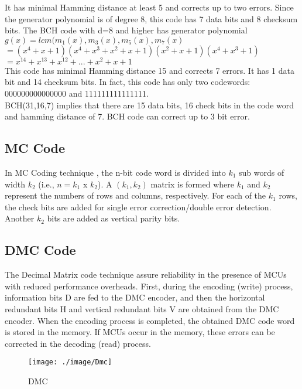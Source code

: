 \documentclass[12pt,a4paper]{report}
\begin{document}
It has minimal Hamming distance at least 5 and corrects up to two errors. Since the generator polynomial is of degree 8, this code has 7 data bits and 8 checksum bits.
The BCH code with d=8 and higher has generator polynomial\\
$g(x) = lcm(m_1(x),m_3(x),m_5(x),m_7(x)$\\
$	= (x^4 + x + 1)(x^4 + x^3 + x^2 + x + 1)(x^2 + x + 1)(x^4 + x^3 + 1)$\\
$	= x^{14} + x^{13} + x^{12} + ... +x^2 + x +1$\\ 
This code has minimal Hamming distance 15 and corrects 7 errors. It has 1 data bit and 14 checksum bits. In fact, this code has only two codewords: 000000000000000 and 111111111111111.\\

BCH(31,16,7)  implies that there are 15 data bits, 16 check bits in the code word and hamming distance of 7. BCH code can correct up to 3 bit error.

\subsection{MC Code}
In MC Coding technique \cite{ArgyridesPradhanKocak}, the n-bit code word is divided into $k_1$ sub words of width $k_2$ (i.e., $n = k_1$ x $k_2$). A $(k_1,k_2)$ matrix is formed where $k_1$ and $k_2$  represent the numbers of rows and columns, respectively. For each of the $k_1$ rows, the check bits are added for single error correction/double error detection. Another $k_2$ bits are added as vertical parity bits.

\subsection{DMC Code}
The Decimal Matrix code \cite{GuoXiaoMaoZhao} technique assure reliability in the presence of MCUs with reduced performance overheads.
First, during the encoding (write) process, information bits D are fed to the DMC encoder, and then the horizontal redundant bits H and vertical redundant bits V are obtained from the DMC encoder. When the encoding process is completed, the obtained DMC code word is stored in the memory. If MCUs occur in the memory, these errors can be corrected in the decoding (read) process.

 \begin{figure}
  \texttt{[image: ./image/Dmc]}
  \caption{DMC}
  \label{fig:Dmc}
 \end{figure}
\end{document}
